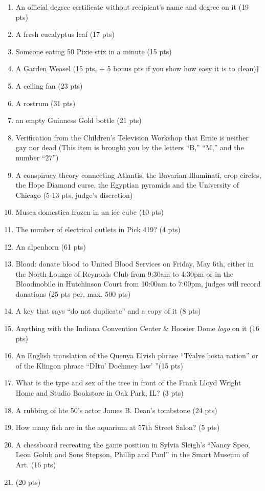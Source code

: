 \begin{enumerate}
\item An official {\UofC} degree certificate without recipient's name and degree on it (19 pts)
\item A fresh eucalyptus leaf (17 pts)
\item Someone eating 50 Pixie stix{\texttrademark} in a minute (15 pts)
\item A Garden Weasel{\texttrademark} (15 pts, + 5 bonus pts if you show how easy it is to clean)$\dagger$
\item A ceiling fan (23 pts)
\item A rostrum (31 pts)
\item an empty Guinness Gold{\texttrademark} bottle (21 pts)
\item Verification from the Children's Television Workshop that Ernie is neither gay nor dead (This item is brought you by the letters ``B,'' ``M,'' and the number ``27'')
\item A conspiracy theory connecting Atlantis, the Bavarian Illuminati, crop circles, the Hope Diamond curse, the Egyptian pyramids and the University of Chicago (5-13 pts, judge's discretion)
\item Musca domestica frozen in an ice cube (10 pts)
\item The number of electrical outlets in Pick 419? (4 pts)
\item An alpenhorn (61 pts)
\item Blood: donate blood to United Blood Services on Friday, May 6th, either in the North Lounge of Reynolds Club from 9:30am to 4:30pm or in the Bloodmobile in Hutchinson Court from 10:00am to 7:00pm, judges will record donations (25 pts per, max. 500 pts)
\item A key that says ``do not duplicate'' and a copy of it (8 pts)
\item Anything with the Indiana Convention Center \& Hoosier Dome {\it logo} on it (16 pts)
\item An English translation of the Quenya Elvish phrase ``T\'valve hosta nation'' or of the Klingon phrase ``DItu' Dochmey law' ''(15 pts)
\item What is the type and sex of the tree in front of the Frank Lloyd Wright Home and Studio Bookstore in Oak Park, IL? (3 pts)
\item A rubbing of hte 50's actor James B. Dean's tombstone (24 pts)
\item How many fish are in the aquarium at 57th Street Salon? (5 pts)
\item A chessboard recreating the game position in Sylvia Sleigh's ``Nancy Speo, Leon Golub and Sons Stepson, Phillip and Paul'' in the Smart Museum of Art. (16 pts)
\item (20 pts)%


\end{enumerate}
